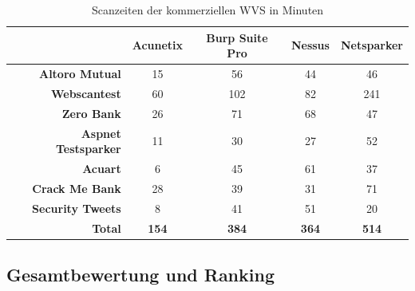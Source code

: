 \documentclass[12pt,oneside,a4paper,parskip]{scrbook}
\begin{document}
\begin{table}[H]
\begin{tabular}{|r|c|c|c|c|}
\hline
                            & \textbf{Acunetix} & \textbf{Burp Suite Pro} & \textbf{Nessus} & \textbf{Netsparker}  \\
\hline
\textbf{Altoro Mutual}      & 15                & 56                      & 44              & 46                   \\
\hline
\textbf{Webscantest}        & 60                & 102                     & 82              & 241                  \\
\hline
\textbf{Zero Bank}          & 26                & 71                      & 68              & 47                   \\
\hline
\textbf{Aspnet Testsparker} & 11                & 30                      & 27              & 52                   \\
\hline
\textbf{Acuart}             & 6                 & 45                      & 61              & 37                   \\
\hline
\textbf{Crack Me Bank}      & 28                & 39                      & 31              & 71                   \\
\hline
\textbf{Security Tweets}    & 8                 & 41                      & 51              & 20                   \\
\hline
\textbf{Total}              & \textbf{154}      & \textbf{384}            & \textbf{364}    & \textbf{514}         \\
\hline
\end{tabular}
\caption[Scanzeiten der kommerziellen WVS in Minuten]{Scanzeiten der kommerziellen WVS in Minuten}
\end{table}


     \newpage
     \subsection{Gesamtbewertung und Ranking}
\end{document}
